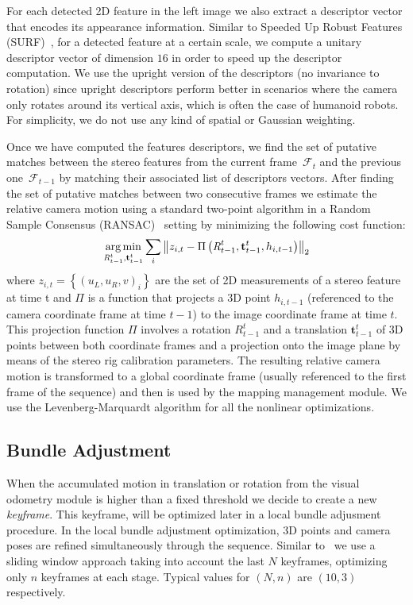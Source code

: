 For each detected 2D feature in the left image we also extract a
descriptor vector that encodes its appearance information. Similar to
Speeded Up Robust Features (SURF)~\cite{Bay08cviu}, for a detected
feature at a certain scale, we compute a unitary descriptor vector of
dimension $16$ in order to speed up the descriptor computation. We use
the upright version of the descriptors (no invariance to rotation)
since upright descriptors perform better in scenarios where the camera
only rotates around its vertical axis, which is often the case of
humanoid robots. For simplicity, we do not use any kind of spatial or
Gaussian weighting.

Once we have computed the features descriptors, we find the set of
putative matches between the stereo features from the current
frame~$\mathcal{F}_{t}$ and the previous one~$\mathcal{F}_{t-1}$ by
matching their associated list of descriptors vectors. After finding
the set of putative matches between two consecutive frames we estimate
the relative camera motion using a standard two-point algorithm in a
Random Sample Consensus (RANSAC)~\cite{Bolles81ijcai} setting by
minimizing the following cost function:
%
\begin{equation} \label{eq:three_pt}
\argmin_{\textit{R}_{t-1}^{t},\mathbf{t}_{t-1}^{t}} \sum\limits_{i} \left\| z_{i,t} - \Pi\left(\textit{R}_{t-1}^{t},\mathbf{t}_{t-1}^{t},h_{i,t-1}\right)\right\|_{2}
\end{equation}
%
where $z_{i,t}=\left\{\left(u_{L},u_{R},v\right)_{i}\right\}$ are the
set of 2D measurements of a stereo feature at time t and $\Pi$ is a
function that projects a 3D point $h_{i,t-1}$ (referenced to the
camera coordinate frame at time $t-1$) to the image coordinate frame
at time $t$. This projection function $\Pi$ involves a rotation
$\textit{R}_{t-1}^{t}$ and a translation $\mathbf{t}_{t-1}^{t}$ of 3D
points between both coordinate frames and a projection onto the image
plane by means of the stereo rig calibration parameters. The resulting
relative camera motion is transformed to a global coordinate frame
(usually referenced to the first frame of the sequence) and then is
used by the mapping management module. We use the Levenberg-Marquardt
algorithm for all the nonlinear optimizations.

\subsection{Bundle Adjustment}\label{sec:ba}
When the accumulated motion in translation or rotation from the visual
odometry module is higher than a fixed threshold we decide to create a
new \textit{keyframe}. This keyframe, will be optimized later in a
local bundle adjusment procedure. In the local bundle adjustment
optimization, 3D points and camera poses are refined simultaneously
through the sequence. Similar to~\cite{Mouragnon09ivc} we use a
sliding window approach taking into account the last $N$ keyframes,
optimizing only $n$ keyframes at each stage. Typical values for
$\left(N,n\right)$ are $\left(10,3\right)$ respectively.

